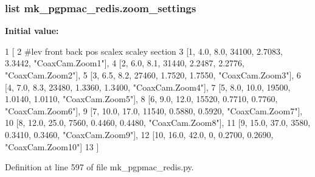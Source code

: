 \hypertarget{namespacemk__pgpmac__redis_ad91bac9be746f99e1cf1f8e28ff348be}{
\subsubsection[{zoom\-\_\-settings}]{\setlength{\rightskip}{0pt plus 5cm}list mk\-\_\-pgpmac\-\_\-redis.\-zoom\-\_\-settings}}\label{namespacemk__pgpmac__redis_ad91bac9be746f99e1cf1f8e28ff348be}
{\bfseries Initial value\-:}
\begin{DoxyCode}
1 [
2     \textcolor{comment}{#lev   front  back  pos     scalex  scaley   section}
3     [1,     4.0,   8.0,  34100, 2.7083,  3.3442, \textcolor{stringliteral}{"CoaxCam.Zoom1"}],
4     [2,     6.0,   8.1,  31440, 2.2487,  2.2776, \textcolor{stringliteral}{"CoaxCam.Zoom2"}],
5     [3,     6.5,   8.2,  27460, 1.7520,  1.7550, \textcolor{stringliteral}{"CoaxCam.Zoom3"}],
6     [4,     7.0,   8.3,  23480, 1.3360,  1.3400, \textcolor{stringliteral}{"CoaxCam.Zoom4"}],
7     [5,     8.0,  10.0,  19500, 1.0140,  1.0110, \textcolor{stringliteral}{"CoaxCam.Zoom5"}],
8     [6,     9.0,  12.0,  15520, 0.7710,  0.7760, \textcolor{stringliteral}{"CoaxCam.Zoom6"}],
9     [7,    10.0,  17.0,  11540, 0.5880,  0.5920, \textcolor{stringliteral}{"CoaxCam.Zoom7"}],
10     [8,    12.0,  25.0,   7560, 0.4460,  0.4480, \textcolor{stringliteral}{"CoaxCam.Zoom8"}],
11     [9,    15.0,  37.0,   3580, 0.3410,  0.3460, \textcolor{stringliteral}{"CoaxCam.Zoom9"}],
12     [10,   16.0,  42.0,      0, 0.2700,  0.2690, \textcolor{stringliteral}{"CoaxCam.Zoom10"}]
13     ]
\end{DoxyCode}


Definition at line 597 of file mk\-\_\-pgpmac\-\_\-redis.\-py.

